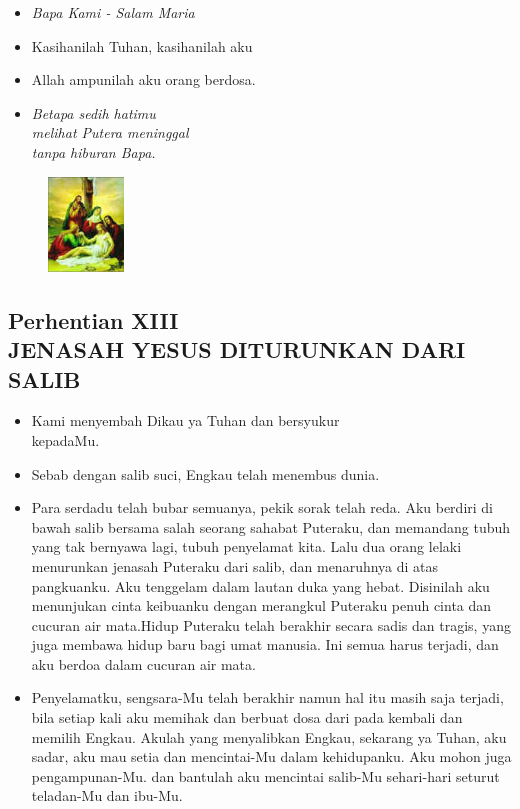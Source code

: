 \documentclass[a5paper,headsepline,titlepage,10pt,nnormalheadings,DIVcalc]{scrbook}
\newcommand{\BU}[1]{\begin{itemize} \item[U:] #1 \end{itemize}}
\newcommand{\BP}[1]{\begin{itemize} \item[P:] #1 \end{itemize}}
\begin{document}
\large\begin{itemize}\item[~]\it{Bapa Kami - Salam Maria}\end{itemize}\normalsize
\BP{Kasihanilah Tuhan, kasihanilah aku}
   \BU{Allah ampunilah aku orang berdosa.}

\begin{itemize}
\item[12.] \it{Betapa sedih hatimu\\melihat Putera meninggal\\
      tanpa hiburan Bapa.
}\end{itemize}

\begin{figure}
\includegraphics[width=2cm]{jalansalib_files/13_small.jpg}
\end{figure}
\subsection*{Perhentian XIII\\
JENASAH YESUS DITURUNKAN DARI SALIB}

\BP{   Kami menyembah Dikau ya Tuhan dan bersyukur\\kepadaMu.}
\BU{   Sebab dengan salib suci, Engkau telah menembus dunia.}

\BP{Para serdadu telah bubar semuanya, pekik sorak telah reda. Aku berdiri di bawah salib bersama salah seorang sahabat Puteraku, dan memandang tubuh yang tak bernyawa lagi, tubuh penyelamat kita. Lalu dua orang lelaki menurunkan jenasah Puteraku dari salib, dan menaruhnya di atas pangkuanku. Aku tenggelam dalam lautan duka yang hebat. Disinilah aku menunjukan cinta keibuanku dengan merangkul Puteraku penuh cinta dan cucuran air mata.Hidup Puteraku telah berakhir secara sadis dan tragis, yang juga membawa hidup baru bagi umat manusia. Ini semua harus terjadi, dan aku berdoa dalam cucuran air mata.}

\BU{Penyelamatku, sengsara-Mu telah berakhir  namun  hal itu masih saja terjadi, bila setiap kali aku memihak dan berbuat dosa dari pada kembali dan memilih Engkau. Akulah yang menyalibkan Engkau, sekarang ya Tuhan, aku sadar, aku mau setia dan mencintai-Mu dalam kehidupanku. Aku mohon juga pengampunan-Mu.     dan bantulah aku mencintai salib-Mu sehari-hari seturut teladan-Mu dan ibu-Mu.}
\end{document}

